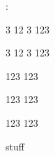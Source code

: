 \documentclass{article}
\begin{document}
\ExplSyntaxOn
\prettyinit:
\ExplSyntaxOff


	\begin{saveenvghost} 3  
  12 3  
		123
	\end{saveenvghost}

\prettyV\data

	\begin{saveenv} 3  
  12 3  
		123
	\end{saveenv}

\prettyV\data

\ExplSyntaxOn
{}

\ExplSyntaxOff

	\begin{custom}
		123	
		123 
	\end{custom}

	\prettyV\data

	\begin{custom *^}
		123  
		123		
	\end{custom *^}

	\begin{custom *^}
		123  
		123		
	\end{custom *^}

\prettyV\data

stuff
\end{document}
